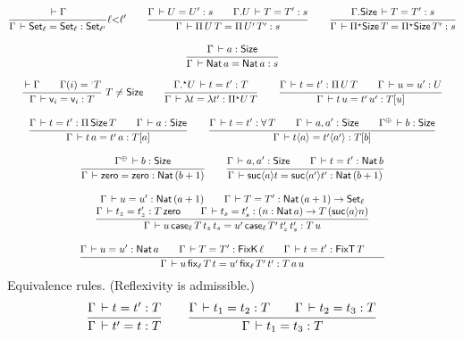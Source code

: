 \documentclass[acmlarge,review,anonymous]{acmart}\settopmatter{printfolios=true}
\begin{document}
\begin{gather*}
  \ru{\der \Gamma
    }{\Gamma \der \Set[\ell] = \Set[\ell]: \Set[\ell']
    }{\ell {<} \ell'}
\qquad
  \ru{\Gamma \der U = U' : s \qquad
      \cext \Gamma U \der T = T' : s
    }{\Gamma \der \piT U T = \piT{U'}T': s}
\qquad
  \ru{\cext \Gamma \Size \der T = T' : s
    }{\Gamma \der \epiT \Size T = \epiT \Size T' : s}
\\[2ex]
  \ru{%
      \Gamma \der a : \Size
    }{\Gamma \der \Nat a = \Nat a : s}
\\[2ex]
  \rux{\der \Gamma \qquad \Gamma(i) = \erann[\noterased] T
    }{\Gamma \der \ind i = \ind i : T
    }{T \not= \Size}
\qquad
  \ru{\eext \Gamma U \der t = t' : T
    }{\Gamma \der \lambda t = \lambda t' : \epiT U T}
\qquad
  \ru{\Gamma \der t = t' : \piT U T \qquad
      \Gamma \der u = u' : U
    }{\Gamma \der t\,u = t'\,u' : T[u]}
\\[2ex]
  \ru{\Gamma \der t = t' : \piT \Size T \qquad
      \Gamma \der a : \Size
    }{\Gamma \der t\,a = t'\,a : T[a]}
\qquad
  \ru{\Gamma \der t = t' : \forallT T \qquad
      \Gamma \der a, a' : \Size \qquad
      \resurrect\Gamma \der b : \Size
    }{\Gamma \der t \ann a = t' \ann{a'} : T[b]}
\\[2ex] %
  \ru{\resurrect\Gamma \der b : \Size
    }{\Gamma \der \tzero = \tzero : \Nat (b + 1)}
\qquad
  \ru{\Gamma \der a, a' : \Size \qquad
      \Gamma \der t = t' : \Nat b
    }{\Gamma \der \suc a t = \suc {a'} t' : \Nat (b + 1)}
\\[2ex]
  \ru{\Gamma \der u = u' : \Nat (a + 1) \qquad
      \Gamma \der T = T' : \Nat (a + 1) \to \Set[\ell] \\
      \Gamma \der t_z = t_z' : T \, \tzero \qquad
      \Gamma \der t_s = t_s' : (n : \Nat a) \to T \, (\suc a n)
    }{\Gamma \der u\,\case[\ell] T {t_z} t_s = u'\,\case[\ell] {T'} {t_z'} t_s' : T \, u}
\\[2ex]
  \ru{\Gamma \der u = u' : \Nat a \qquad
      \Gamma \der T = T' : \FixK\,\ell \qquad %
      \Gamma \der t = t' : \FixT\,T \qquad %
     }{\Gamma \der u\,\fix[\ell] T t = u'\,\fix[\ell] {T'} t' : T \, a \, u}
\end{gather*}
Equivalence rules.  (Reflexivity is admissible.)
\begin{gather*}
  \ru{\Gamma \der t = t' : T
    }{\Gamma \der t' = t : T}
\qquad
  \ru{\Gamma \der t_1 = t_2 : T \qquad
      \Gamma \der t_2 = t_3 : T
    }{\Gamma \der t_1 = t_3 : T}
\end{gather*}
\end{document}
